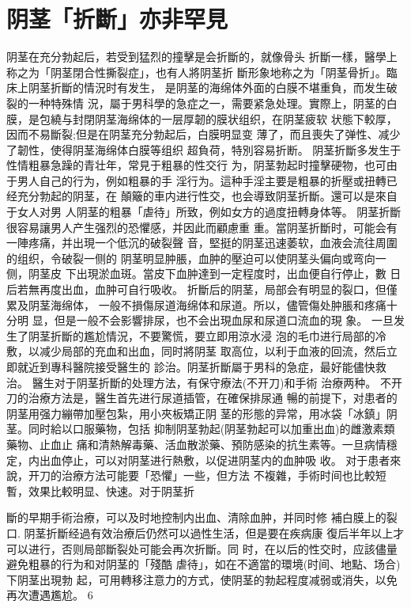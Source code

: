 \documentclass[12pt,UTF8]{ctexbook}
\begin{document}
\section{阴茎「折斷」亦非罕見}
阴茎在充分勃起后，若受到猛烈的撞擊是会折斷的，就像骨头
折斷一樣，醫學上称之为「阴茎閉合性撕裂症」，也有人將阴茎折
斷形象地称之为「阴茎骨折」。臨床上阴茎折斷的情況时有发生，
是阴茎的海绵体外面的白膜不堪重負，而发生破裂的一种特殊情
況，屬于男科學的急症之一，需要紧急处理。實際上，阴茎的白
膜，是包繞与封閉阴茎海绵体的一层厚韌的膜状组织，在阴茎疲软
状態下較厚，因而不易斷裂;但是在阴茎充分勃起后，白膜明显变
薄了，而且喪失了弹性、减少了韌性，使得阴茎海绵体白膜等组织
超負荷，特別容易折断。
阴茎折斷多发生于性情粗暴急躁的青壮年，常見于粗暴的性交行
为，阴茎勃起时撞擊硬物，也可由于男人自己的行为，例如粗暴的手
淫行为。這种手淫主要是粗暴的折壓或扭轉已经充分勃起的阴茎，在
顛簸的車内进行性交，也会導致阴茎折斷。還可以是來自于女人对男
人阴茎的粗暴「虐待」所致，例如女方的過度扭轉身体等。
阴茎折斷很容易讓男人产生强烈的恐懼感，并因此而顧慮重
重。當阴茎折斷时，可能会有一陣疼痛，并出現一个低沉的破裂聲
音，堅挺的阴茎迅速萎软，血液会流往周圍的组织，令破裂一侧的
阴茎明显肿脹，血肿的壓迫可以使阴茎头偏向或弯向一侧，阴茎皮
下出現淤血斑。當皮下血肿達到一定程度时，出血便自行停止，數
日后若無再度出血，血肿可自行吸收。
折斷后的阴茎，局部会有明显的裂口，但僅累及阴茎海绵体，
一般不損傷尿道海绵体和尿道。所以，儘管傷处肿脹和疼痛十分明
显，但是一般不会影響排尿，也不会出現血尿和尿道口流血的現
象。
一旦发生了阴茎折斷的尷尬情況，不要驚慌，要立即用涼水浸
泡的毛巾进行局部的冷敷，以减少局部的充血和出血，同时將阴茎
取高位，以利于血液的回流，然后立即就近到專科醫院接受醫生的
診治。阴茎折斷屬于男科的急症，最好能儘快救治。
醫生对于阴茎折斷的处理方法，有保守療法(不开刀)和手術
治療两种。
不开刀的治療方法是，醫生首先进行尿道插管，在確保排尿通
暢的前提下，对患者的阴茎用强力繃帶加壓包紮，用小夾板矯正阴
茎的形態的异常，用冰袋「冰鎮」阴茎。同时給以口服藥物，包括
抑制阴茎勃起(阴茎勃起可以加重出血)的雌激素類藥物、止血止
痛和清熱解毒藥、活血散淤藥、預防感染的抗生素等。一旦病情穩
定，内出血停止，可以对阴茎进行熱敷，以促进阴茎内的血肿吸
收。
对于患者來說，开刀的治療方法可能要「恐懼」一些，但方法
不複雜，手術时间也比較短暫，效果比較明显、快速。对于阴茎折

斷的早期手術治療，可以及时地控制内出血、清除血肿，并同时修
補白膜上的裂口.
阴茎折斷经過有效治療后仍然可以過性生活，但是要在疾病康
復后半年以上才可以进行，否则局部斷裂处可能会再次折斷。同
时，在以后的性交时，应該儘量避免粗暴的行为和对阴茎的「殘酷
虐待」，如在不適當的環境(时间、地點、场合)下阴茎出現勃
起，可用轉移注意力的方式，使阴茎的勃起程度减弱或消失，以免
再次遭遇尷尬。
6
\end{document}
